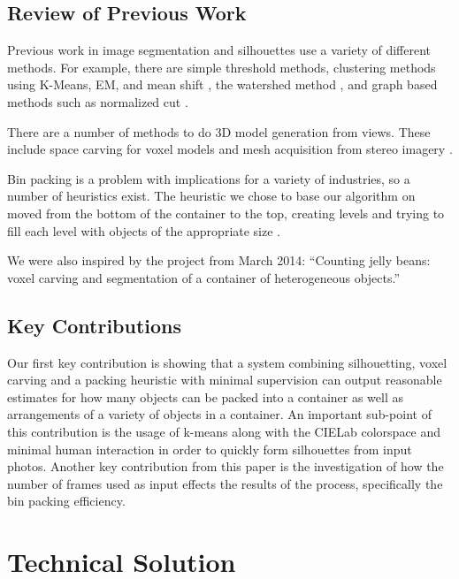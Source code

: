 \documentclass[10pt,twocolumn,letterpaper]{article}
\begin{document}
\subsection{Review of Previous Work}

Previous work in image segmentation and silhouettes use a variety of different methods. For example, there are simple threshold methods, clustering methods using K-Means, EM, and mean shift \cite{comaniciu2002mean} \cite{liureview}, the watershed method \cite{beucher1992morphological}, and graph based methods such as normalized cut \cite{shi2000normalized}.

There are a number of methods to do 3D model generation from views. These include space carving for voxel models \cite{kutulakos2000theory} and mesh acquisition from stereo imagery \cite{morency2002fast}.

Bin packing is a problem with implications for a variety of industries, so a number of heuristics exist. The heuristic we chose to base our algorithm on moved from the bottom of the container to the top, creating levels and trying to fill each level with objects of the appropriate size \cite{bialek2014packaging}.

We were also inspired by the project from March 2014: ``Counting jelly beans: voxel carving and segmentation of a container of heterogeneous objects.'' \cite{jellybeans}


\subsection{Key Contributions}
Our first key contribution is showing that a system combining silhouetting, voxel carving and a packing heuristic with minimal supervision can output reasonable estimates for how many objects can be packed into a container as well as arrangements of a variety of objects in a container. An important sub-point of this contribution is the usage of k-means along with the CIELab colorspace and minimal human interaction in order to quickly form silhouettes from input photos. Another key contribution from this paper is the investigation of how the number of frames used as input effects the results of the process, specifically the bin packing efficiency.

\section{Technical Solution}
\end{document}
